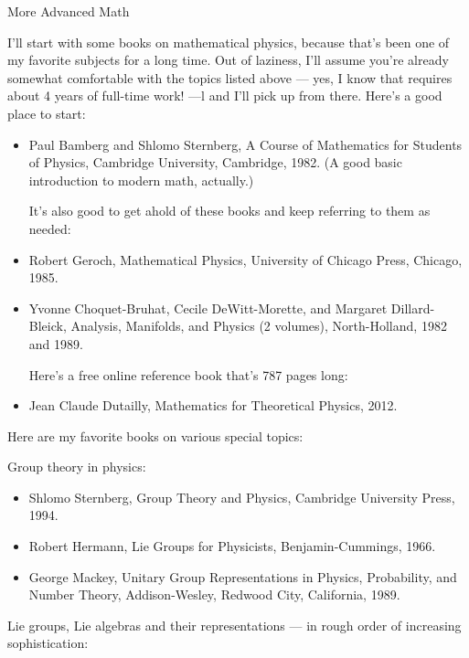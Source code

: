 \documentclass[10pt,a4paper]{book}
\theoremstyle{definition}
\begin{document}
More Advanced Math

I'll start with some books on mathematical physics, because that's been one of my favorite subjects for a long time. Out of laziness, I'll assume you're already somewhat comfortable with the topics listed above — yes, I know that requires about 4 years of full-time work! —l and I'll pick up from there. Here's a good place to start:

\begin{itemize}
\item Paul Bamberg and Shlomo Sternberg, A Course of Mathematics for Students of Physics, Cambridge University, Cambridge, 1982. (A good basic introduction to modern math, actually.)

It's also good to get ahold of these books and keep referring to them as needed:

\item Robert Geroch, Mathematical Physics, University of Chicago Press, Chicago, 1985.
\item Yvonne Choquet-Bruhat, Cecile DeWitt-Morette, and Margaret Dillard-Bleick, Analysis, Manifolds, and Physics (2 volumes), North-Holland, 1982 and 1989.

Here's a free online reference book that's 787 pages long:

\item Jean Claude Dutailly, Mathematics for Theoretical Physics, 2012.
\end{itemize}

Here are my favorite books on various special topics:

Group theory in physics:

\begin{itemize}
\item Shlomo Sternberg, Group Theory and Physics, Cambridge University Press, 1994.
\item Robert Hermann, Lie Groups for Physicists, Benjamin-Cummings, 1966.
\item George Mackey, Unitary Group Representations in Physics, Probability, and Number Theory, Addison-Wesley, Redwood City, California, 1989.
\end{itemize}

Lie groups, Lie algebras and their representations — in rough order of increasing sophistication:
\end{document}
